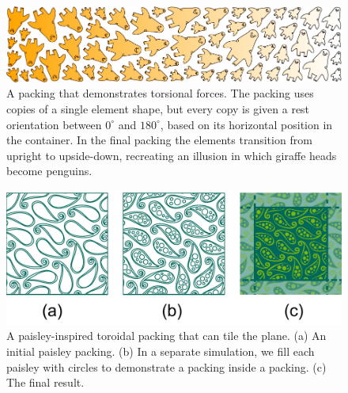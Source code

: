 \begin{figure}
\centering
\includegraphics[width=1.0\textwidth]{figures/repulsionpak/giraffe_penguin.pdf}
\caption[A packing that demonstrates torsional forces]
{\label{giraffe_penguin_packing}
A packing that demonstrates torsional forces.
The packing uses copies of a single element shape, but every copy is given a rest orientation between $0^\circ$
and $180^\circ$, based on its horizontal position in the container.  In the final packing the elements transition
from upright to upside-down, recreating an illusion in which giraffe heads become penguins.}
\end{figure}

\begin{figure}
\centering
\includegraphics[width=0.95\columnwidth]{figures/repulsionpak/paisley_new.pdf} 
\vspace{-10pt}
\caption[A paisley-inspired toroidal packing that can tile the plane]
{\label{paisley_packing}
A paisley-inspired toroidal packing that can tile the plane. 
           (a) An initial paisley packing.
           (b) In a separate simulation, we fill each paisley with circles to demonstrate a packing inside a packing.
           (c) The final result.
}
\end{figure}

